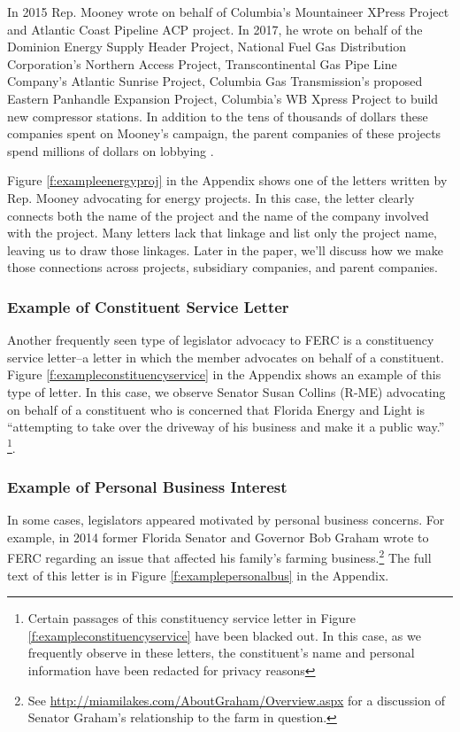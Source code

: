 \documentclass{article}
\begin{document}
In 2015 Rep. Mooney wrote on behalf of Columbia's Mountaineer XPress Project and Atlantic Coast Pipeline ACP project.  In 2017, he wrote on behalf of the Dominion Energy Supply Header Project, National Fuel Gas Distribution Corporation’s Northern Access Project, Transcontinental Gas Pipe Line Company's Atlantic Sunrise Project, Columbia Gas Transmission's proposed Eastern Panhandle Expansion Project, Columbia's WB Xpress Project to build new compressor stations. In addition to the tens of thousands of dollars these companies spent on Mooney's campaign, the parent companies of these projects spend millions of dollars on lobbying \citep{Lobbyview2019}.

Figure \ref{f:exampleenergyproj} in the Appendix shows one of the letters written by Rep. Mooney advocating for energy projects.  In this case, the letter clearly connects both the name of the project and the name of the company involved with the project.  Many letters lack that linkage and list only the project name, leaving us to draw those linkages.  Later in the paper, we'll discuss how we make those connections across projects, subsidiary companies, and parent companies.  


\subsubsection{Example of Constituent Service Letter}

Another frequently seen type of legislator advocacy to FERC is a constituency service letter--a letter in which the member advocates on behalf of a constituent.  Figure \ref{f:exampleconstituencyservice} in the Appendix shows an example of this type of letter. 
In this case, we observe Senator Susan Collins (R-ME) advocating on behalf of a constituent who is concerned that Florida Energy and Light is ``attempting to take over the driveway of his business and make it a public way.'' \footnote{Certain passages of this constituency service letter in Figure \ref{f:exampleconstituencyservice} have been blacked out. In this case, as we frequently observe in these letters, the constituent's name and personal information have been redacted for privacy reasons}. 


\subsubsection{Example of Personal Business Interest}

In some cases, legislators appeared motivated by personal business concerns.  For example, in 2014 former Florida Senator and Governor Bob Graham wrote to FERC regarding an issue that affected his family's farming business.\footnote{See  \url{http://miamilakes.com/AboutGraham/Overview.aspx} for a discussion of Senator Graham's relationship to the farm in question.}  The full text of this letter is in Figure \ref{f:examplepersonalbus} in the Appendix.
\end{document}
